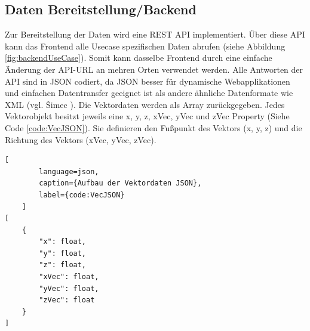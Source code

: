 \subsection{Daten Bereitstellung/Backend}
\label{section:Backend}

Zur Bereitstellung der Daten wird eine REST API implementiert.
Über diese API kann das Frontend alle Usecase spezifischen Daten
abrufen (siehe Abbildung \ref{fig:backendUseCase}). Somit kann dasselbe Frontend durch eine einfache Änderung der API-URL an mehren
Orten verwendet werden. Alle Antworten der API sind in JSON codiert,
da JSON besser für dynamische Webapplikationen und einfachen
Datentransfer geeignet ist als andere ähnliche Datenformate wie
XML (vgl. Šimec \cite{comparisonJsonXml}). Die Vektordaten werden
als Array zurückgegeben. Jedes Vektorobjekt besitzt jeweils eine
x, y, z, xVec, yVec und zVec Property (Siehe Code \ref{code:VecJSON}).
Sie definieren den Fußpunkt des Vektors (x, y, z) und die Richtung
des Vektors (xVec, yVec, zVec).

\begin{codeblock}
	\begin{lstlisting}[
		language=json,
		caption={Aufbau der Vektordaten JSON},
		label={code:VecJSON}
	]
[
	{
		"x": float,
		"y": float,
		"z": float,
		"xVec": float,
		"yVec": float,
		"zVec": float
	}
]
	\end{lstlisting}
\end{codeblock}

